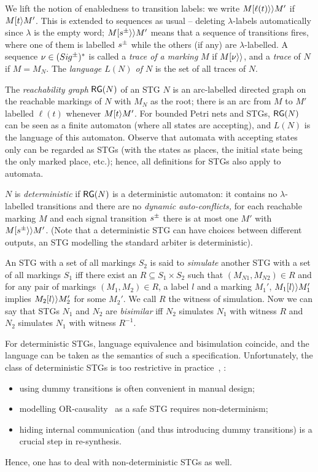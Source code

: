 \smallskip


We lift the notion of enabledness to transition labels: we write
$M[\ell(t)\rangle\rangle  M'$ if $M[t\rangle  M'$. This is extended to sequences
as usual -- deleting $\lambda$-labels automatically since $\lambda$
is the empty word; \ie $M[s^\pm\rangle\rangle M'$ means that a sequence of
transitions fires, where one of them is labelled $s^\pm$ while the
others (if any) are $\lambda$-labelled. A sequence
$\nu\in(\Sig\upd)^*$ is called a \emph{trace of a marking} $M$ if
$M[\nu\rangle\rangle$, and a \emph{trace} of $N$ if $M=M_N$. The \emph{language $L(N)$
of $N$} is the set of all traces of $N$.

\smallskip

The \emph{reachability graph} $\mathsf{RG}(N)$ of an STG $N$ is an arc-labelled
directed graph on the reachable markings of $N$ with $M_N$ as the root;
there is an arc from $M$ to $M'$ labelled $\ell(t)$ whenever
$M[t\rangle M'$. For bounded Petri nets and STGs, $\mathsf{RG}(N)$ can be seen as a finite automaton
(where all states are accepting), and $L(N)$ is the language of this
automaton.
Observe that automata with accepting states only can be
regarded as STGs (with the states as places, the initial state being the
only marked place, etc.); hence, all definitions for STGs also
apply to automata.

$N$ is \emph{deterministic} if $\mathsf{RG}(N)$
is a deterministic automaton: it contains no $\lambda$-labelled transitions
and there are no \emph{dynamic auto-conflicts,} \ie for each reachable marking $M$ and each signal transition $s^\pm$
there is at most one $M'$ with $M [s^\pm\rangle\rangle M'$. (Note that a deterministic STG
can have choices between different outputs, \eg an STG modelling
the standard arbiter is deterministic).

An STG with a set of all markings $S_2$ is said to \emph{simulate} another STG with 
a set of all markings $S_1$ iff there exist an 
$R \subseteq S_1 \times S_2$ such that $(M_{N 1},M_{N 2}) \in R$ and for any pair of markings 
$(M_1, M_2) \in R$, a label $l$ and a marking $M_1'$, $M_1[l\rangle\rangle  M_1'$ implies 
$M_2 [l\rangle\rangle M_2'$ for some $M_2'$. We call $R$ the witness of simulation. Now we can say that STGs $N_1$ and $N_2$ are \emph{bisimilar} iff $N_2$ simulates $N_1$ with witness $R$ and $N_2$ simulates $N_1$ with witness $R^{-1}$.

For deterministic STGs, language equivalence and bisimulation coincide, and the language can be taken as the semantics of such a specification. Unfortunately, the class of deterministic STGs is too restrictive in practice~\cite{KSV-08}, \eg:
\begin{itemize}
  \item using dummy transitions is often convenient in manual design;
  \item modelling OR-causality~\cite{ykklp96} as a safe STG requires non-determinism;
  \item hiding internal communication (and thus introducing dummy transitions) is a crucial step in re-synthesis.
\end{itemize}
Hence, one has to deal with non-deterministic STGs as well.


